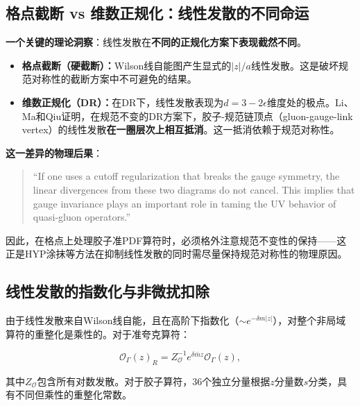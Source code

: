 \documentclass[12pt,a4paper]{ctexart}
\theoremstyle{definition}
\begin{document}
\subsection{格点截断 vs 维数正规化：线性发散的不同命运}

\textbf{一个关键的理论洞察}\cite{Li2018multiplicative,Zhang2019}：线性发散在\textbf{不同的正规化方案下表现截然不同}。

\begin{itemize}
    \item \textbf{格点截断（硬截断）：}Wilson线自能图产生显式的$|z|/a$线性发散。这是破坏规范对称性的截断方案中不可避免的结果。
    \item \textbf{维数正规化（DR）：}在DR下，线性发散表现为$d=3-2\epsilon$维度处的极点。Li、Ma和Qiu\cite{Li2018multiplicative}证明，在规范不变的DR方案下，胶子-规范链顶点（gluon-gauge-link vertex）的线性发散\textbf{在一圈层次上相互抵消}。这一抵消依赖于规范对称性。
\end{itemize}

\textbf{这一差异的物理后果}\cite{Li2018multiplicative,Zhang2019}：

\begin{quote}
``If one uses a cutoff regularization that breaks the gauge symmetry, the linear divergences from these two diagrams do not cancel. This implies that gauge invariance plays an important role in taming the UV behavior of quasi-gluon operators.''\cite{Li2018multiplicative}
\end{quote}

因此，在格点上处理胶子准PDF算符时，必须格外注意规范不变性的保持——这正是HYP涂抹等方法在抑制线性发散的同时需尽量保持规范对称性的物理原因。

\subsection{线性发散的指数化与非微扰扣除}

由于线性发散来自Wilson线自能，且在高阶下指数化（$\sim e^{-\delta m |z|}$），对整个非局域算符的重整化是乘性的\cite{Chen2016improved,Li2018multiplicative}。对于准夸克算符：

\begin{equation}
\mathcal{O}_\Gamma(z)_R = Z^{-1}_{\mathcal{O}} e^{\delta\bar{m}z} \mathcal{O}_\Gamma(z),
\label{eq:renorm_operator}
\end{equation}

其中$Z_{\mathcal{O}}$包含所有对数发散。对于胶子算符，36个独立分量根据$z$分量数$s$分类，具有不同但乘性的重整化常数\cite{Li2018multiplicative}。
\end{document}
